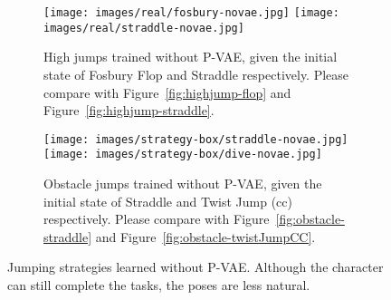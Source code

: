 \begin{figure*}
    \centering
    \begin{subfigure}[b]{0.99\linewidth}
        \texttt{[image: images/real/fosbury-novae.jpg]}
        \texttt{[image: images/real/straddle-novae.jpg]}
        \caption{High jumps trained without P-VAE, given the initial state of Fosbury Flop and Straddle respectively. Please compare with Figure~\ref{fig:highjump-flop} and Figure~\ref{fig:highjump-straddle}.}
    \end{subfigure}
    \begin{subfigure}[b]{0.99\linewidth}
        \texttt{[image: images/strategy-box/straddle-novae.jpg]}
        \texttt{[image: images/strategy-box/dive-novae.jpg]}
        \caption{Obstacle jumps trained without P-VAE, given the initial state of Straddle and Twist Jump (cc) respectively. Please compare with Figure~\ref{fig:obstacle-straddle} and Figure~\ref{fig:obstacle-twistJumpCC}.}
    \end{subfigure}
    \caption{Jumping strategies learned without P-VAE. Although the character can still complete the tasks, the poses are less natural.}
    \label{fig:ablation}
\end{figure*}
